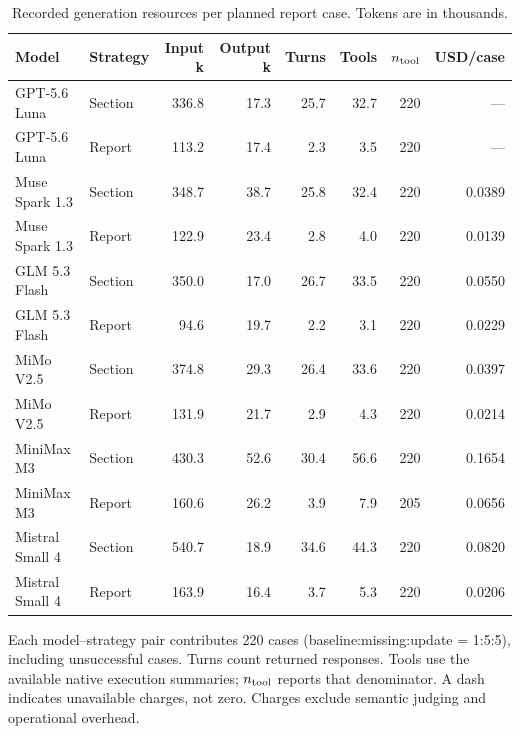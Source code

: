\begin{table}[t]
\centering\small
\setlength{\tabcolsep}{4pt}
\caption{Recorded generation resources per planned report case. Tokens are in thousands.}
\label{tab:supp-resources}
\begin{tabular}{llrrrrrr}
\toprule
Model & Strategy & Input k & Output k & Turns & Tools & $n_{\rm tool}$ & USD/case \\
\midrule
GPT-5.6 Luna & Section & 336.8 & 17.3 & 25.7 & 32.7 & 220 & --- \\
GPT-5.6 Luna & Report & 113.2 & 17.4 & 2.3 & 3.5 & 220 & --- \\
Muse Spark 1.3 & Section & 348.7 & 38.7 & 25.8 & 32.4 & 220 & 0.0389 \\
Muse Spark 1.3 & Report & 122.9 & 23.4 & 2.8 & 4.0 & 220 & 0.0139 \\
GLM 5.3 Flash & Section & 350.0 & 17.0 & 26.7 & 33.5 & 220 & 0.0550 \\
GLM 5.3 Flash & Report & 94.6 & 19.7 & 2.2 & 3.1 & 220 & 0.0229 \\
MiMo V2.5 & Section & 374.8 & 29.3 & 26.4 & 33.6 & 220 & 0.0397 \\
MiMo V2.5 & Report & 131.9 & 21.7 & 2.9 & 4.3 & 220 & 0.0214 \\
MiniMax M3 & Section & 430.3 & 52.6 & 30.4 & 56.6 & 220 & 0.1654 \\
MiniMax M3 & Report & 160.6 & 26.2 & 3.9 & 7.9 & 205 & 0.0656 \\
Mistral Small 4 & Section & 540.7 & 18.9 & 34.6 & 44.3 & 220 & 0.0820 \\
Mistral Small 4 & Report & 163.9 & 16.4 & 3.7 & 5.3 & 220 & 0.0206 \\
\bottomrule
\end{tabular}
\par\vspace{3pt}
\begin{minipage}{0.98\linewidth}\footnotesize
Each model--strategy pair contributes 220 cases (baseline:missing:update = 1:5:5), including unsuccessful cases. Turns count returned responses. Tools use the available native execution summaries; $n_{\rm tool}$ reports that denominator. A dash indicates unavailable charges, not zero. Charges exclude semantic judging and operational overhead.
\end{minipage}
\end{table}
